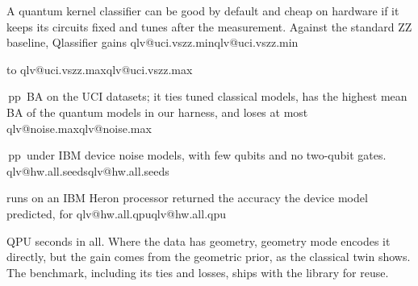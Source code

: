 \documentclass[aps,pra,reprint,superscriptaddress,nofootinbib,longbibliography]{revtex4-2}
\makeatletter
\newcommand{\val}[1]{\ifcsname qlv@#1\endcsname\csname qlv@#1\endcsname\else
  \PackageError{qlassifier}{No value '#1'}{Run python scripts/paper_tables.py}\fi}
\newcommand{\pp}{\,pp}
\makeatother
\begin{document}
A quantum kernel classifier can be good by default and cheap on hardware if it keeps its circuits fixed and tunes
after the measurement. Against the standard ZZ baseline, Qlassifier gains \val{uci.vszz.min} to \val{uci.vszz.max}\pp\ BA on the UCI
datasets; it ties tuned classical models, has the highest mean BA of the quantum models in our harness, and loses at
most \val{noise.max}\pp\ under IBM device noise models, with few qubits and no two-qubit gates. \val{hw.all.seeds} runs on an IBM Heron processor returned the accuracy the device model predicted,
for \val{hw.all.qpu} QPU seconds in all. Where the data has geometry, geometry mode encodes it directly, but the gain comes from the geometric
prior, as the classical twin shows. The benchmark, including its ties and losses, ships with the library for reuse.


\end{document}
